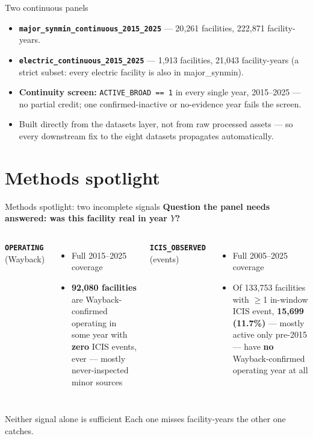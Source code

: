 \documentclass[aspectratio=169,11pt]{beamer}
\begin{document}
\begin{frame}{Two continuous panels}
  \begin{itemize}
    \item \textbf{\texttt{major\_synmin\_continuous\_2015\_2025}} — 20{,}261 facilities, 222{,}871
      facility-years.
    \item \textbf{\texttt{electric\_continuous\_2015\_2025}} — 1{,}913 facilities, 21{,}043 facility-years
      (a strict subset: every electric facility is also in major\_synmin).
    \item \textbf{Continuity screen:} \texttt{ACTIVE\_BROAD == 1} in every single year, 2015--2025 — no
      partial credit; one confirmed-inactive or no-evidence year fails the screen.
    \item Built directly from the datasets layer, not from raw processed assets — so every downstream fix
      to the eight datasets propagates automatically.
  \end{itemize}
\end{frame}

\section{Methods spotlight}
\begin{frame}{Methods spotlight: two incomplete signals}
  \textbf{Question the panel needs answered: was this facility real in year $Y$?}
  \begin{columns}[T]
    \textbf{\texttt{OPERATING}} (Wayback)
    \begin{itemize}
      \small
      \item Full 2015--2025 coverage
      \item \textbf{92{,}080 facilities} are Wayback-confirmed operating in some year with \textbf{zero}
        ICIS events, ever — mostly never-inspected minor sources
    \end{itemize}
    \textbf{\texttt{ICIS\_OBSERVED}} (events)
    \begin{itemize}
      \small
      \item Full 2005--2025 coverage
      \item Of 133{,}753 facilities with $\geq$1 in-window ICIS event, \textbf{15{,}699 (11.7\%)} — mostly
        active only pre-2015 — have \textbf{no} Wayback-confirmed operating year at all
    \end{itemize}
  \end{columns}
  \vspace{0.6em}
  \begin{alertblock}{Neither signal alone is sufficient}
    Each one misses facility-years the other one catches.
  \end{alertblock}
\end{frame}
\end{document}
